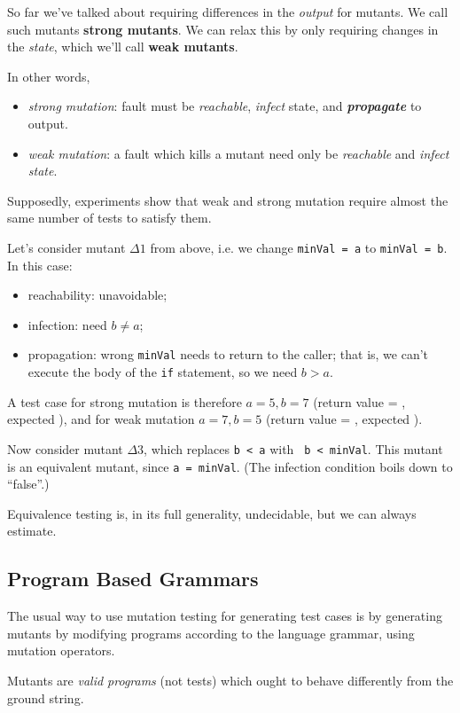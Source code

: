 \documentclass[11pt]{article}
\begin{document}
So far we've talked about requiring differences in the \emph{output}
for mutants.  We call such mutants {\bf strong mutants}.  We can relax
this by only requiring changes in the \emph{state}, which we'll call
{\bf weak mutants}.

In other words, 
\begin{itemize}[noitemsep]
\item \emph{strong mutation}: fault must be \emph{reachable},
\emph{infect} state, and \emph{\bf propagate} to output.
\item \emph{weak mutation}: a fault which kills a mutant need only be
\emph{reachable} and \emph{infect state}.
\end{itemize}
Supposedly, experiments show that weak and strong mutation require
almost the same number of tests to satisfy them.

Let's consider mutant $\Delta 1$ from above, i.e. we change
{\tt minVal = a} to {\tt minVal = b}. In this case:
\begin{itemize}[noitemsep]
\item reachability: unavoidable;
\item infection: need $b \neq a$;
\item propagation: wrong {\tt minVal} needs to return to the caller;
that is, we can't execute the body of the {\tt if} statement, so we
need $b > a$.
\end{itemize}
A test case for strong mutation is therefore $a = 5, b = 7$ (return
value = \textvisiblespace, expected \textvisiblespace), and for
weak mutation $a = 7, b = 5$ (return value = \textvisiblespace, expected
\textvisiblespace).

Now consider mutant $\Delta 3$, which replaces {\tt b < a} with {\tt 
b < minVal}. This mutant is an equivalent mutant, since {\tt a = minVal}.
(The infection condition boils down to ``false''.)

Equivalence testing is, in its full generality, undecidable, but we can always
estimate.

\subsection*{Program Based Grammars} 

The usual way to use mutation testing for generating test cases is by
generating mutants by modifying programs according to the language
grammar, using mutation operators.

Mutants are \emph{valid programs} (not tests) which ought to behave
differently from the ground string.
\end{document}

